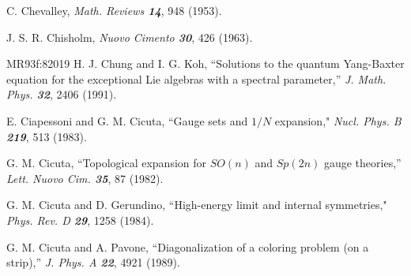  C. Chevalley,
{\em Math.  Reviews  \bf 14}, 948 (1953).

 J. S. R. Chisholm,
{\em Nuovo Cimento  \bf 30}, 426 (1963).

        {MR93f:82019}
H. J. Chung and I. G. Koh,
``Solutions to the quantum Yang-Baxter
  equation for the exceptional Lie algebras with a spectral parameter,''
{\em J. Math. Phys. \bf 32}, 2406 (1991). %

 E. Ciapessoni and G. M. Cicuta,
     ``Gauge sets and $1/N$ expansion,"
    {\em Nucl. Phys. B \bf 219},  513 (1983). %

 G. M. Cicuta, %
        ``Topological expansion for $SO(n)$ and $Sp(2n)$ gauge theories,''
        {\em Lett. Nuovo Cim. \bf 35}, 87 (1982).

 G. M. Cicuta and D. Gerundino, %
    ``High-energy limit and internal symmetries,"
    {\em Phys. Rev. D \bf 29}, 1258 (1984). %

 G. M. Cicuta and A. Pavone,
    ``Diagonalization of a coloring problem (on a strip),''
    {\em J. Phys. A \bf 22}, 4921 (1989).

